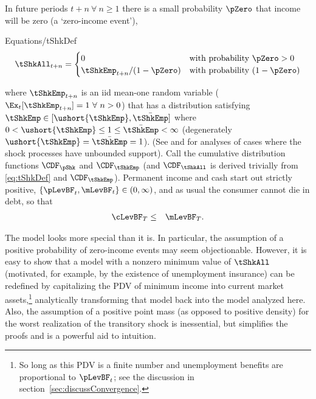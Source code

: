 \documentclass[titlepage]{\econtex}\providecommand{\texname}{BufferStockTheory}
\providecommand{\EqDir}{Equations}
\begin{document}
In future periods $t+n ~\forall~ n \geq 1$ there is a small probability $\pZero$ that income will
be zero (a `zero-income event'),
\begin{verbatimwrite}{\EqDir/tShkDef}
\begin{equation}
\tShkAll _{t+n}=
\begin{cases}
 0\phantom{_{t+1}/\pNotZero} & \text{with probability $\pZero>0$} \\
 \tShkEmp_{t+n}/\pNotZero      & \text{with probability $\pNotZero  $} 
\end{cases} \label{eq:tShkDef}
\end{equation}
\end{verbatimwrite}

where $\tShkEmp_{t+n}$ is an iid mean-one random variable
($\Ex_{t}[{\tShkEmp}_{t+n}]=1~\forall~n>0$)
that has a distribution
satisfying $\tShkEmp \in \lbrack \ushort{\tShkEmp},\bar{\tShkEmp}\rbrack$
where $0<\ushort{\tShkEmp} \leq 1 \leq \bar{\tShkEmp}<\infty$
(degenerately $\ushort{\tShkEmp}=\bar{\tShkEmp}=1$). (See \cite{rabaultBorrowing} and \cite{lsIncFluct} for analyses of cases where the shock processes have unbounded support).  Call the cumulative
distribution functions $\CDF_{\pShk}$ and $\CDF_{\tShkEmp}$ (and $\CDF_{\tShkAll}$
is derived trivially from \eqref{eq:tShkDef} and $\CDF_{\tShkEmp}$).
Permanent income and cash start out strictly positive, $\{\pLevBF_{t},\mLevBF_{t}\} \in
(0,\infty)$, and as usual the consumer cannot die in
debt, so that 
\begin{eqnarray}
  \cLevBF_{T} & \leq & \mLevBF_{T} \label{eq:NoDebtAtDeath}.
\end{eqnarray}

The model looks more special than it is.  In particular, the
assumption of a positive probability of zero-income events may seem
objectionable.  However, it is easy to show that a model with a
nonzero minimum value of $\tShkAll$ (motivated, for example, by the
existence of unemployment insurance) can be redefined by capitalizing
the PDV of minimum income into current market assets,\footnote{So long
  as this PDV is a finite number and unemployment benefits are
  proportional to $\pLevBF_{t}$; see the discussion in
  section~\ref{sec:discussConvergence}.}  analytically transforming
that model back into the model analyzed here.  Also, the assumption of
a positive point mass (as opposed to positive density) for the worst
realization of the transitory shock is inessential, but simplifies the proofs and is a powerful aid to intuition.

\begin{comment}
Combining the transition equations, the recursive nature of
the problem allows us to rewrite it more compactly in Bellman equation form,
\begin{eqnarray*}
\VFunc_{t}(\mLevBF_{t},\pLevBF_{t}) & = & \max_{\cLevBF_{t}}~\left\{\util(\cLevBF_{t})+\DiscFac \Ex_{t}\left[ \VFunc_{t+1}((\mLevBF_{t}-\cLevBF_{t})\Rfree+ \pLevBF_{t+1}\tShkAll_{t+1},\pLevBF_{t} \PGro  \pShk_{t+1})\right]\right\}
.
\end{eqnarray*}
\end{comment}
\end{document}
